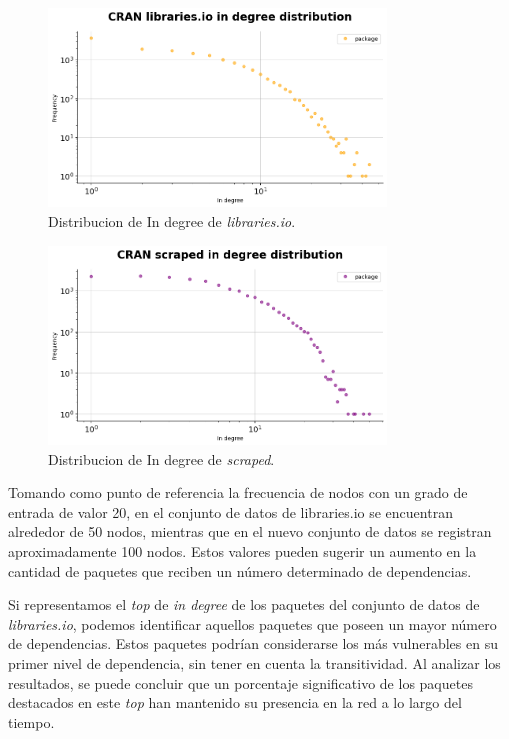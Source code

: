 \begin{figure}[ht!]
    \begin{center}
        \includegraphics[width=0.8\textwidth]{img/cran/ind_lib.png}
        \caption{Distribucion de In degree de \textit{libraries.io}.}
        \label{fig:cran_in_lib}
    \end{center}
\end{figure}

\begin{figure}[ht!]
    \begin{center}
        \includegraphics[width=0.8\textwidth]{img/cran/ind_scr.png}
        \caption{Distribucion de In degree de \textit{scraped}.}
        \label{fig:cran_in_scraped}
    \end{center}
\end{figure}

Tomando como punto de referencia la frecuencia de nodos con un grado de entrada de valor 20,
en el conjunto de datos de libraries.io se encuentran alrededor de 50 nodos, mientras que en
el nuevo conjunto de datos se registran aproximadamente 100 nodos. Estos valores pueden sugerir
un aumento en la cantidad de paquetes que reciben un número determinado de dependencias.


Si representamos el \textit{top} de \textit{in degree} de los paquetes del conjunto de datos
de \textit{libraries.io}, podemos identificar aquellos paquetes que poseen un mayor número de
dependencias. Estos paquetes podrían considerarse los más vulnerables en su primer nivel de dependencia,
sin tener en cuenta la transitividad. Al analizar los resultados, se puede concluir que un porcentaje
significativo de los paquetes destacados en este \textit{top} han mantenido su presencia en la red a
lo largo del tiempo.

